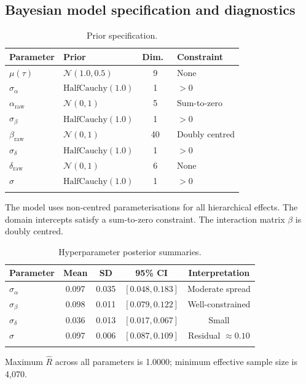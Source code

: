 \documentclass[numsec,webpdf,modern,medium]{oup-authoring-template}
\theoremstyle{thmstyleone}%
\theoremstyle{thmstyletwo}%
\theoremstyle{thmstylethree}%
\begin{document}
\begin{appendices}
\section{Bayesian model specification and diagnostics}\label{app:bayesian}

\begin{table}[!t]
\caption{Prior specification.\label{tab:priors}}%
\begin{tabular*}{\columnwidth}{@{\extracolsep\fill}llcl@{\extracolsep\fill}}
\toprule
Parameter & Prior & Dim.\ & Constraint \\
\midrule
$\mu(\tau)$  & $\mathcal{N}(1.0, 0.5)$    & 9  & None \\
$\sigma_\alpha$ & $\mathrm{HalfCauchy}(1.0)$ & 1  & $> 0$ \\
$\alpha_{\mathrm{raw}}$ & $\mathcal{N}(0, 1)$ & 5  & Sum-to-zero \\
$\sigma_\beta$  & $\mathrm{HalfCauchy}(1.0)$ & 1  & $> 0$ \\
$\beta_{\mathrm{raw}}$  & $\mathcal{N}(0, 1)$ & 40 & Doubly centred \\
$\sigma_\delta$ & $\mathrm{HalfCauchy}(1.0)$ & 1  & $> 0$ \\
$\delta_{\mathrm{raw}}$ & $\mathcal{N}(0, 1)$ & 6  & None \\
$\sigma$        & $\mathrm{HalfCauchy}(1.0)$ & 1  & $> 0$ \\
\botrule
\end{tabular*}
\begin{tablenotes}%
\item The model uses non-centred parameterisations for all hierarchical effects. The domain intercepts satisfy a sum-to-zero constraint. The interaction matrix $\beta$ is doubly centred.
\end{tablenotes}
\end{table}

\begin{table}[!t]
\caption{Hyperparameter posterior summaries.\label{tab:hyper}}%
\begin{tabular*}{\columnwidth}{@{\extracolsep\fill}lcccc@{\extracolsep\fill}}
\toprule
Parameter & Mean & SD & 95\% CI & Interpretation \\
\midrule
$\sigma_\alpha$ & 0.097 & 0.035 & $[0.048, 0.183]$ & Moderate spread \\
$\sigma_\beta$  & 0.098 & 0.011 & $[0.079, 0.122]$ & Well-constrained \\
$\sigma_\delta$ & 0.036 & 0.013 & $[0.017, 0.067]$ & Small \\
$\sigma$        & 0.097 & 0.006 & $[0.087, 0.109]$ & Residual $\approx 0.10$ \\
\botrule
\end{tabular*}
\begin{tablenotes}%
\item Maximum $\hat{R}$ across all parameters is 1.0000; minimum effective sample size is 4,070.
\end{tablenotes}
\end{table}


\end{appendices}
\end{document}
